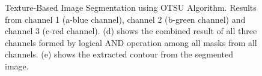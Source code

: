 \documentclass{article}
\begin{document}
\begin{figure}[!htbp]
     \centering
    \captionsetup[subfigure]{labelformat=empty}
    \caption{Texture-Based Image Segmentation using OTSU Algorithm. Results from channel 1 (a-blue channel), channel 2 (b-green channel) and channel 3 (c-red channel). (d) shows the combined result of all three channels formed by logical AND operation among all masks from all channels. (e) shows the extracted contour from the segmented image.}
    \label{fig:cat_3}
\end{figure}
\end{document}
